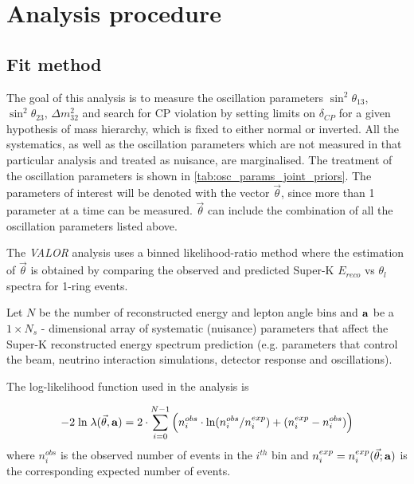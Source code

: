 \clearpage

\section {Analysis procedure}
\label{sec:oscfit}

\subsection {Fit method}
\label{sec:oscfit_method}

The goal of this analysis is to measure the oscillation parameters
$\sin^2 \theta_{13}$, $\sin^2 \theta_{23}$, $\Delta m^2_{32}$ and
search for CP violation by setting limits on $\delta_{CP}$
for a given hypothesis of mass hierarchy, which is fixed to either normal or inverted.
All the systematics, as well as the oscillation parameters which are not measured
in that particular analysis and treated as nuisance, are marginalised.
The treatment of the oscillation parameters is shown in \cref{tab:osc_params_joint_priors}.
The parameters of interest will be denoted with the vector $\vec{\theta}$,
since more than 1 parameter at a time can be measured.
$\vec{\theta}$ can include the combination of all the oscillation parameters listed above.


The {\em VALOR} analysis uses a binned likelihood-ratio method where
the estimation of $\vec{\theta}$ is obtained
by comparing the observed and predicted Super-K $E_{reco}$ vs $\theta_l$ spectra
for 1-ring events.

Let $N$ be the number of reconstructed energy and lepton angle bins and
${\bf a}$ be a $1 \times N_{s}$ - dimensional array of systematic (nuisance) 
parameters that affect the Super-K reconstructed energy spectrum prediction (e.g.
parameters that control the beam, neutrino interaction simulations, 
detector response and oscillations).


The log-likelihood function used in the analysis is

\begin{equation} \label{eq:chisquare}
-2 \; \textrm{ln} \; \lambda (\vec{\theta},{\bf a}) = 2 \cdot \sum_{i=0}^{N-1} 
   \Big( 
     n^{obs}_{i} \cdot \textrm{ln} (n^{obs}_{i}/n^{exp}_{i}) +
     (n^{exp}_{i}-n^{obs}_{i}) 
   \Big) 
\end{equation}
where
$n^{obs}_{i}$ is the observed number of events in the $i^{th}$ bin and
$n^{exp}_{i} = n^{exp}_{i}(\vec{\theta}; {\bf a})$ 
is the corresponding expected number of events.


